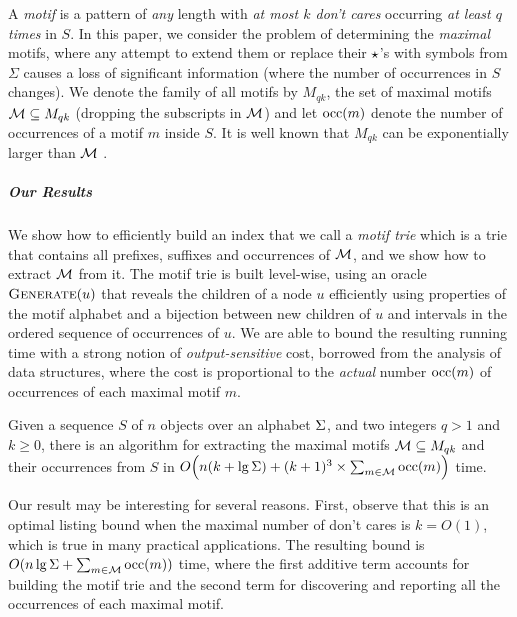 A \emph{motif} is a pattern of \emph{any} length with \emph{at most   $k$ don't cares} occurring \emph{at least $q$ times} in $S$. In this paper, we consider the problem of determining the \emph{maximal} motifs, where any attempt to extend them or replace their $\star$'s with symbols from $\Sigma$ causes a loss of significant information (where the number of occurrences in $S$ changes).  We denote the family of all motifs by $M_{qk}$, the set of maximal motifs $\mathcal{M} \subseteq M_{qk}$ (dropping the subscripts in $\mathcal{M}$) and let $\operatorname{occ}(m)$ denote the number of occurrences of a motif $m$ inside $S$. It is well known that $M_{qk}$ can be exponentially larger than $\mathcal{M}$ \cite{Parida00}.

\subparagraph{Our Results}
We show how to efficiently build an index that we call a \emph{motif trie} which is a trie that contains all prefixes, suffixes and occurrences of $\mathcal{M}$, and we show how to extract $\mathcal{M}$ from it. The motif trie is built level-wise, using an oracle $\operatorname{\textsc{Generate}}(u)$ that reveals the children of a node $u$ efficiently using properties of the motif alphabet and a bijection between new children of $u$ and intervals in the ordered sequence of occurrences of $u$. We are able to bound the resulting running time with a strong notion of \emph{output-sensitive} cost, borrowed from the analysis of data structures, where the cost is proportional to the \emph{actual} number $\operatorname{occ}(m)$ of occurrences of each maximal motif $m$.

\begin{theorem}\label{the:main}
    Given a sequence $S$ of $n$ objects over an alphabet $\Sigma$, and two integers $q > 1$ and $k \geq 0$, there is an algorithm for extracting the maximal motifs $\mathcal{M} \subseteq M_{qk}$ and their occurrences from $S$ in 
$
O \Bigl( n (k + \lg \Sigma) + (k+1)^3 \times  \sum_{m \in \mathcal{M}} \operatorname{occ}(m) \Bigr)
$
time.
\end{theorem}

Our result may be interesting for several reasons.
%
First, observe that this is an optimal listing bound when the maximal number of don't cares is $k=O(1)$, which is true in many practical applications. The resulting bound is $O(n \lg \Sigma + \sum_{m \in \mathcal{M}} \operatorname{occ}(m))$ time, where the first additive term accounts for building the motif trie and the second term for discovering and reporting all the occurrences of each maximal motif. 

